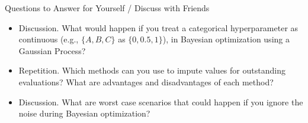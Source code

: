 \begin{frame}[c]{Questions to Answer for Yourself / Discuss with Friends}

\begin{itemize}
\item \alert{Discussion.} What would happen if you treat a categorical hyperparameter as continuous (e.g., $\{A, B, C\}$ as $\{0, 0.5, 1\}$), in Bayesian optimization using a Gaussian Process?
\medskip
\item \alert{Repetition.} Which methods can you use to impute values for outstanding evaluations? What are advantages and disadvantages of each method?
\medskip
\item \alert{Discussion.} What are worst case scenarios that could happen if you ignore the noise during Bayesian optimization?
\end{itemize}
\end{frame}